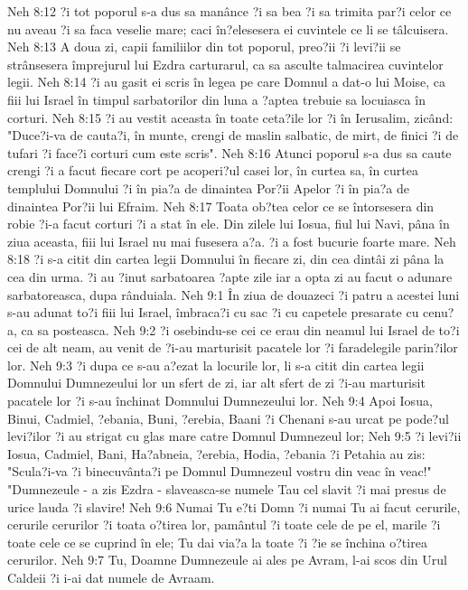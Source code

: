 Neh 8:12  ?i tot poporul s-a dus sa manânce ?i sa bea ?i sa trimita par?i celor ce nu aveau ?i sa faca veselie mare; caci în?elesesera ei cuvintele ce li se tâlcuisera.
Neh 8:13  A doua zi, capii familiilor din tot poporul, preo?ii ?i levi?ii se strânsesera împrejurul lui Ezdra carturarul, ca sa asculte talmacirea cuvintelor legii.
Neh 8:14  ?i au gasit ei scris în legea pe care Domnul a dat-o lui Moise, ca fiii lui Israel în timpul sarbatorilor din luna a ?aptea trebuie sa locuiasca în corturi.
Neh 8:15  ?i au vestit aceasta în toate ceta?ile lor ?i în Ierusalim, zicând: "Duce?i-va de cauta?i, în munte, crengi de maslin salbatic, de mirt, de finici ?i de tufari ?i face?i corturi cum este scris".
Neh 8:16  Atunci poporul s-a dus sa caute crengi ?i a facut fiecare cort pe acoperi?ul casei lor, în curtea sa, în curtea templului Domnului ?i în pia?a de dinaintea Por?ii Apelor ?i în pia?a de dinaintea Por?ii lui Efraim.
Neh 8:17  Toata ob?tea celor ce se întorsesera din robie ?i-a facut corturi ?i a stat în ele. Din zilele lui Iosua, fiul lui Navi, pâna în ziua aceasta, fiii lui Israel nu mai fusesera a?a. ?i a fost bucurie foarte mare.
Neh 8:18  ?i s-a citit din cartea legii Domnului în fiecare zi, din cea dintâi zi pâna la cea din urma. ?i au ?inut sarbatoarea ?apte zile iar a opta zi au facut o adunare sarbatoreasca, dupa rânduiala.
Neh 9:1  În ziua de douazeci ?i patru a acestei luni s-au adunat to?i fiii lui Israel, îmbraca?i cu sac ?i cu capetele presarate cu cenu?a, ca sa posteasca.
Neh 9:2  ?i osebindu-se cei ce erau din neamul lui Israel de to?i cei de alt neam, au venit de ?i-au marturisit pacatele lor ?i faradelegile parin?ilor lor.
Neh 9:3  ?i dupa ce s-au a?ezat la locurile lor, li s-a citit din cartea legii Domnului Dumnezeului lor un sfert de zi, iar alt sfert de zi ?i-au marturisit pacatele lor ?i s-au închinat Domnului Dumnezeului lor.
Neh 9:4  Apoi Iosua, Binui, Cadmiel, ?ebania, Buni, ?erebia, Baani ?i Chenani s-au urcat pe pode?ul levi?ilor ?i au strigat cu glas mare catre Domnul Dumnezeul lor;
Neh 9:5  ?i levi?ii Iosua, Cadmiel, Bani, Ha?abneia, ?erebia, Hodia, ?ebania ?i Petahia au zis: "Scula?i-va ?i binecuvânta?i pe Domnul Dumnezeul vostru din veac în veac!" "Dumnezeule - a zis Ezdra - slaveasca-se numele Tau cel slavit ?i mai presus de urice lauda ?i slavire!
Neh 9:6  Numai Tu e?ti Domn ?i numai Tu ai facut cerurile, cerurile cerurilor ?i toata o?tirea lor, pamântul ?i toate cele de pe el, marile ?i toate cele ce se cuprind în ele; Tu dai via?a la toate ?i ?ie se închina o?tirea cerurilor.
Neh 9:7  Tu, Doamne Dumnezeule ai ales pe Avram, l-ai scos din Urul Caldeii ?i i-ai dat numele de Avraam.

